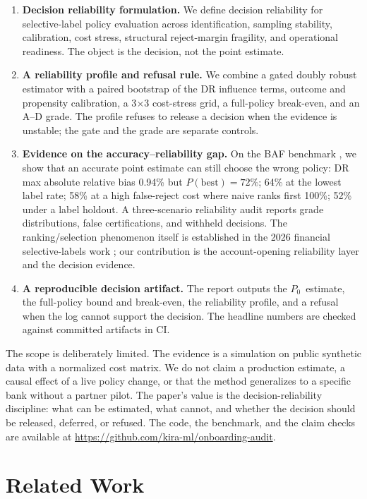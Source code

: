 \documentclass[conference]{IEEEtran}
\newcommand{\Pzero}{\ensuremath{P_0}}
\begin{document}
\begin{enumerate}
\item \textbf{Decision reliability formulation.} We define decision reliability for selective-label policy evaluation across identification, sampling stability, calibration, cost stress, structural reject-margin fragility, and operational readiness. The object is the decision, not the point estimate.
\item \textbf{A reliability profile and refusal rule.} We combine a gated doubly robust estimator with a paired bootstrap of the DR influence terms, outcome and propensity calibration, a 3$\times$3 cost-stress grid, a full-policy break-even, and an A--D grade. The profile refuses to release a decision when the evidence is unstable; the gate and the grade are separate controls.
\item \textbf{Evidence on the accuracy--reliability gap.} On the BAF benchmark \cite{jesus2022baf}, we show that an accurate point estimate can still choose the wrong policy: DR max absolute relative bias 0.94\% but $P(\text{best})=72\%$; 64\% at the lowest label rate; 58\% at a high false-reject cost where naive ranks first 100\%; 52\% under a label holdout. A three-scenario reliability audit reports grade distributions, false certifications, and withheld decisions. The ranking/selection phenomenon itself is established in the 2026 financial selective-labels work \cite{kuroki2026oscar,bhola2026,hong2026doit}; our contribution is the account-opening reliability layer and the decision evidence.
\item \textbf{A reproducible decision artifact.} The report outputs the \Pzero\ estimate, the full-policy bound and break-even, the reliability profile, and a refusal when the log cannot support the decision. The headline numbers are checked against committed artifacts in CI.
\end{enumerate}

The scope is deliberately limited. The evidence is a simulation on public synthetic data with a normalized cost matrix. We do not claim a production estimate, a causal effect of a live policy change, or that the method generalizes to a specific bank without a partner pilot. The paper's value is the decision-reliability discipline: what can be estimated, what cannot, and whether the decision should be released, deferred, or refused. The code, the benchmark, and the claim checks are available at \url{https://github.com/kira-ml/onboarding-audit}.

\section{Related Work}
\end{document}

